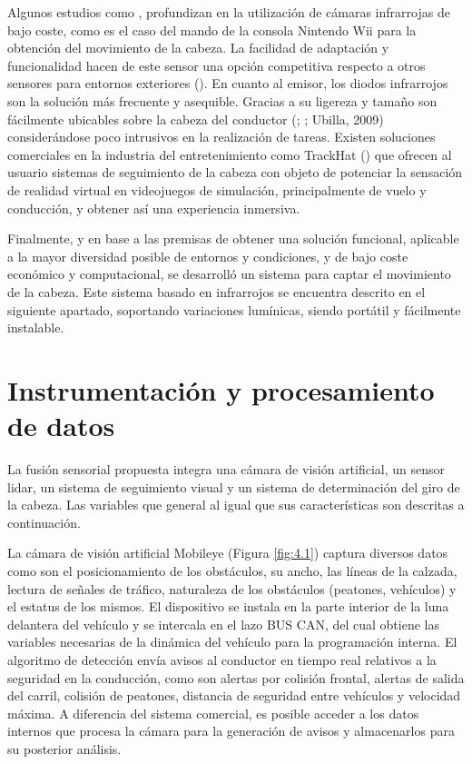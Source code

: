 Algunos estudios como \textcite{pavlik}, profundizan en la utilización de cámaras infrarrojas de bajo coste, como es el caso del mando de la consola Nintendo Wii para la obtención del movimiento de la cabeza. La facilidad de adaptación y funcionalidad hacen de este sensor una opción competitiva respecto a otros sensores para entornos exteriores (\cite{lin}). En cuanto al emisor, los diodos infrarrojos son la solución más frecuente y asequible. Gracias a su ligereza y tamaño son fácilmente ubicables sobre la cabeza del conductor (\cite{murthy}; \cite{deldjoo}; Ubilla, 2009) considerándose poco intrusivos en la realización de tareas. Existen soluciones comerciales en la industria del entretenimiento como TrackHat (\cite{trackhat}) que ofrecen al usuario sistemas de seguimiento de la cabeza con objeto de potenciar la sensación de realidad virtual en videojuegos de simulación, principalmente de vuelo y conducción, y obtener así una experiencia inmersiva. 

Finalmente, y en base a las premisas de obtener una solución funcional, aplicable a la mayor diversidad posible de entornos y condiciones, y de bajo coste económico y computacional, se desarrolló un sistema para captar el movimiento de la cabeza. Este sistema basado en infrarrojos se encuentra descrito en el siguiente apartado, soportando variaciones lumínicas, siendo portátil y fácilmente instalable. 

\section{Instrumentación y procesamiento de datos}\label{42}

La fusión sensorial propuesta integra una cámara de visión artificial, un sensor \gls{lidar}, un sistema de seguimiento visual y un sistema de determinación del giro de la cabeza. Las variables que general al igual que sus características son descritas a continuación.

La cámara de visión artificial Mobileye (Figura \ref{fig:4.1}) captura diversos datos como son el posicionamiento de los obstáculos, su ancho, las líneas de la calzada, lectura de señales de tráfico, naturaleza de los obstáculos (peatones, vehículos) y el estatus de los mismos. El dispositivo se instala en la parte interior de la luna delantera del vehículo y se intercala en el lazo BUS CAN, del cual obtiene las variables necesarias de la dinámica del vehículo para la programación interna. El algoritmo de detección envía avisos al conductor en tiempo real relativos a la seguridad en la conducción, como son alertas por colisión frontal, alertas de salida del carril, colisión de peatones, distancia de seguridad entre vehículos y velocidad máxima. A diferencia del sistema comercial, es posible acceder a los datos internos que procesa la cámara para la generación de avisos y almacenarlos para su posterior análisis.

